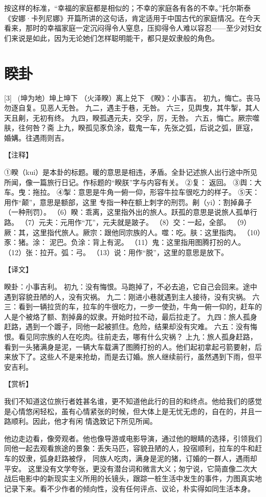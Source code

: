 \documentclass[12pt,UTF8]{ctexbook}
\begin{document}
按这样的标准，“幸福的家庭都是相似的；不幸的家庭各有各的不幸。”托尔斯泰《安娜·卡列尼娜》开篇所讲的这句话，肯定适用于中国古代的家庭情况。在今天看来，那时的幸福家庭一定沉闷得令人窒息，压抑得令人难以容忍——至少对妇女们来说是如此，因为无论她们怎样聪明能干，都只是奴隶般的角色。

\chapter{睽卦}
[3] \ (坤为地）坤上坤下
（火泽睽）离上兑下
《睽》：小事吉。
初九，悔亡。丧马勿逐自复。见恶人无咎。
九二，遇主于巷，无咎。
六三，见舆曳，其牛掣，其人天且劓，无初有终。
九四，睽孤遇元夫，交孚，厉，无咎。
六五，悔亡。厥宗噬肤，往何咎？斋
上九，睽孤见豕负涂，载鬼一车，先张之弧，后说之弧，匪寇，婚媾。往遇雨则吉。

【注释】

①睽（kui）是本卦的标题。暖的意思是相违，矛盾。全卦记述旅人出行途中所见所闻，像一篇旅行日记。作标题的“睽朕”字与内容有关。
②复： 返回。
③舆：大车。曳：拖拉。
④掣：意思是牛角一俯一仰，形容牛拉车很吃力的样子。
⑤天：用作“颠”，意思是额部，这里 专指一种在额上刺字的刑罚。劓（yi）：割掉鼻子（一种刑罚）。
（6）睽：乖离，这里指外出的旅人。跃孤的意思是说旅人孤单行路。
（7）元夫：元用作“兀”，元夫就是跛子。
（8）交：一起，全部。
（9）厥：其，这里指代旅人。厥宗：跟他同宗族的人。噬：吃。肤：这里指肉。
（10）豕：猪。涂： 泥巴。负涂：背上有泥。
（11）鬼：这里指用图腾打扮的人。
（12）张：拉开。弧：弓。
（13）说：用作“脱”，这里的意思是放下。

【译文】

睽卦：小事吉利。
初九：没有悔恨。马跑掉了，不必去追，它自己会回来。途中遇到容貌丑陋的人，没有灾祸。
九二：刚进小巷就遇到主人接待，没有灾祸。
六三：看到一辆拉货的车，拉车的牛很吃力，一步一使劲，牛角一俯一仰的，赶车的人是个被烙了额、割掉鼻的奴隶。开始时拉不动，最后拉走了。
九四：旅人孤身赶路，遇到一个踱子，同他一起被抓住。危险，结果却没有灾难。
六五：没有悔恨。看见同宗族的人在吃肉。往前走去，哪有什么灾祸？
上九：旅人孤身赶路，看到一头猪满身是泥，一辆大车载满了图腾打扮的人。他们起初拿起弓箭要射，后来放下了。这些人不是来抢劫，而是去订婚。旅人继续前行，虽然遇到下雨，但平安吉利。

【赏析】

我们不知道这位旅行者姓甚名谁，更不知道他此行的目的和终点。他给我们的感觉是心情悠闲轻松，虽有心情紧张的时候，但大体上是无忧无虑的，自在的，并且一路顺利。因此，他才有闲 情逸致记下所见所闻。

他边走边看，像旁观者。他也像导游或电影导演，通过他的眼睛的选择，引领我们同他一起去观看旅途的景象：丢失马匹，容貌丑陋的人，投宿顺利，拉车的牛和赶车的奴隶，弧身赶路被俘， 同族人吃肉，满身是泥的猪，订婚的一群人，遇雨却平安。 这里没有文学夸张，更没有潜台词和微言大义；匆宁说，它简直像二次大战后电影中的新现实主义所用的长镜头，跟踪一桩生活中发生的事件，力图真实地记录下来。看不少作者的倾向性，没有任何评点、议论，朴实得如同生活本身。
\end{document}
